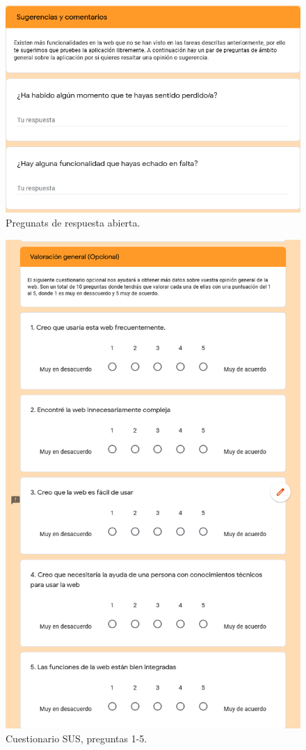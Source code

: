 \begin{figure}[h!]
	\centering
	\includegraphics[width=0.7\linewidth]{Imagenes/Bitmap/Preguntas-respuestalibre}
	\caption{Pregunats de respuesta abierta.}
	\label{fig:preguntas-respuestalibre}
\end{figure}


\begin{figure}[h!]
	\centering
	\includegraphics[width=0.7\linewidth]{Imagenes/Bitmap/Valoracion_general_sus1}
	\caption{Cuestionario SUS, preguntas 1-5.}
	\label{fig:valoraciongeneralsus1}
\end{figure}


